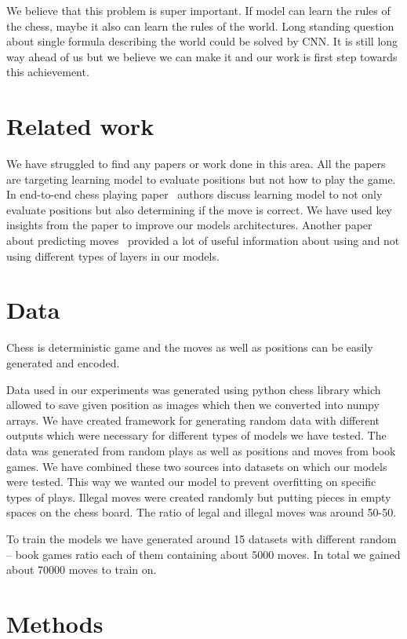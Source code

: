 \documentclass[10pt,twocolumn,letterpaper]{article}
\begin{document}
We believe that this problem is super important. If model can learn the rules of
the chess, maybe it also can learn the rules of the world. Long standing
question about single formula describing the world could be solved by CNN. It is
still long way ahead of us but we believe we can make it and our work is first
step towards this achievement.

\section{Related work}

We have struggled to find any papers or work done in this area. All the papers
are targeting learning model to evaluate positions but not how to play
the game. In end-to-end chess playing paper~\cite{DeepChess} authors discuss learning
model to not only evaluate positions but also determining if the move is correct.
We have used key insights from the paper to improve our models architectures.
Another paper about predicting moves~\cite{Oshri2015PredictingMI} provided a lot
of useful information about using and not using different types of layers in our
models.

\section{Data}

Chess is deterministic game and the moves as well as positions can be easily
generated and encoded.

Data used in our experiments was generated using python chess library which
allowed to save given position as images which then we converted into numpy
arrays. We have created framework for generating random data with different
outputs which were necessary for different types of models we have tested. The
data was generated from random plays as well as positions and moves from book
games. We have combined these two sources into datasets on which our models were
tested. This way we wanted our model to prevent overfitting on specific types of
plays. Illegal moves were created randomly but putting pieces in empty spaces on
the chess board. The ratio of legal and illegal moves was around 50-50.

To train the models we have generated around 15 datasets with different random
-- book games ratio each of them containing about 5000 moves. In total we gained
about 70000 moves to train on.

\section{Methods}
\end{document}
